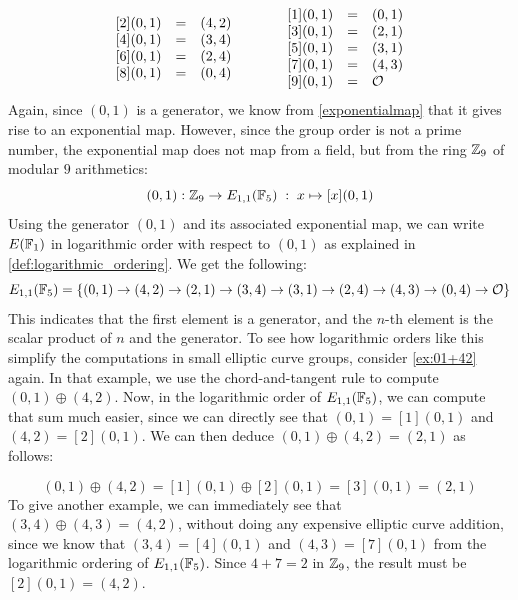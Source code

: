\begin{example}
\begin{equation}
\begin{array}{lccr}
\begin{array}{lcl}
{}[2](0,1) &=& (4, 2) \\ 
{}[4](0,1) &=& (3, 4) \\ 
{}[6](0,1) &=& (2, 4) \\ 
{}[8](0,1) &=& (0, 4) \\ 
\end{array} & & &
{}\begin{array}{lcl}
{}[1](0,1) &=& (0, 1) \\
{}[3](0,1) &=& (2, 1) \\
{}[5](0,1) &=& (3, 1) \\
{}[7](0,1) &=& (4, 3) \\
{}[9](0,1) &=& \mathcal{O}
\end{array}
\end{array}
\end{equation}
Again, since $(0,1)$ is a generator, we know from \eqref{exponentialmap} that it gives rise to an exponential map. However, since the group order is not a prime number, the exponential map does not map from a field, but from the ring $\mathbb{Z}_9$ of modular $9$ arithmetics:
\begin{equation}
[\cdot](0,1): \Z_9 \to E_{1,1}(\F_5)\; : \; x\mapsto [x](0,1) 
\end{equation}
Using the generator $(0,1)$ and its associated exponential map, we can write $E(\mathbb{F}_1)$ in logarithmic order with respect to $(0,1)$ as explained in  \ref{def:logarithmic_ordering}. We get the following:
\begin{equation}
E_{1,1}(\mathbb{F}_5) = \{(0, 1)\to (4, 2)\to (2, 1)\to (3, 4)\to (3, 1)\to (2, 4)\to (4, 3)\to (0, 4)\to \mathcal{O} \}
\end{equation}
This indicates that the first element is a generator, and the $n$-th element is the scalar product of $n$ and the generator. To see how logarithmic orders like this simplify the computations in small elliptic curve groups, consider \examplename{} \ref{ex:01+42} again. In that example, we use the chord-and-tangent rule to compute $(0,1)\oplus (4,2)$. Now, in the logarithmic order of $E_{1,1}(\mathbb{F}_5)$, we can compute that sum much easier, since we can directly see that $(0,1)=[1](0,1)$ and $(4,2)=[2](0,1)$. We can then deduce $(0,1)\oplus (4,2)= (2,1)$ as follows:

\begin{equation}
(0,1)\oplus (4,2)=[1](0,1)\oplus [2](0,1)= [3](0,1)=(2,1)
\end{equation}
To give another example, we can immediately see that $(3,4)\oplus (4,3) = (4,2)$, without doing any expensive elliptic curve addition, since we know that $(3,4)= [4](0,1)$ and  $(4,3)= [7](0,1)$ from the logarithmic ordering of $E_{1,1}(\mathbb{F}_5)$. Since $4+7 = 2$ in $\mathbb{Z}_9$, the result must be $[2](0,1)=(4,2)$.


\end{example}
